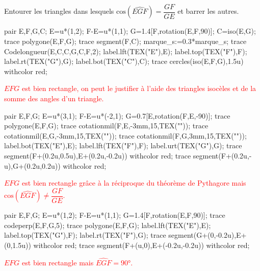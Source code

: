 \begin{corrige}
    Entourer les triangles dans lesquels \mbox{$\text{cos}(\widehat{EGF})=\dfrac{GF}{GE}$} et barrer les autres.
    
    \begin{minipage}{0.45\linewidth}
        \begin{Geometrie}
            pair E,F,G,C;
            E=u*(1,2);
            F-E=u*(1,1);            
            G=1.4[F,rotation(E,F,90)];
            C=iso(E,G);            
            trace polygone(E,F,G);
            trace segment(F,C);
            marque_s:=0.3*marque_s;
            trace Codelongueur(E,C,C,G,C,F,2);
            label.lft(TEX("E"),E);
            label.top(TEX("F"),F);
            label.rt(TEX("G"),G);
            label.bot(TEX("C"),C);
            trace cercles(iso(E,F,G),1.5u) withcolor red;
        \end{Geometrie}
        \textcolor{red}{$EFG$ est bien rectangle, on peut le justifier à l'aide des triangles isocèles et de la somme des angles d'un triangle.}

        \bigskip
        \begin{Geometrie}
            pair E,F,G;
            E=u*(3,1);
            F-E=u*(-2,1);            
            G=0.7[E,rotation(F,E,-90)];            
            trace polygone(E,F,G);            
            trace cotationmil(F,E,-3mm,15,TEX(""));
            trace cotationmil(E,G,-3mm,15,TEX(""));
            trace cotationmil(F,G,3mm,15,TEX(""));
            label.bot(TEX("E"),E);
            label.lft(TEX("F"),F);
            label.urt(TEX("G"),G);
            trace segment(F+(0.2u,0.5u),E+(0.2u,-0.2u)) withcolor red;
            trace segment(F+(0.2u,-u),G+(0.2u,0.2u)) withcolor red;
        \end{Geometrie}
        \textcolor{red}{$EFG$ est bien rectangle grâce à la réciproque du théorème de Pythagore mais $\text{cos}(\widehat{EGF})\neq\dfrac{GF}{GE}$.}
    \end{minipage}
    \hfill
    \begin{minipage}{0.45\linewidth}
        \begin{Geometrie}
            pair E,F,G;
            E=u*(1,2);
            F-E=u*(1,1);            
            G=1.4[F,rotation(E,F,90)];
            trace codeperp(E,F,G,5);
            trace polygone(E,F,G);
            label.lft(TEX("E"),E);
            label.top(TEX("G"),F);
            label.rt(TEX("F"),G);
            trace segment(G+(0,-0.2u),E+(0,1.5u)) withcolor red;
            trace segment(F+(u,0),E+(-0.2u,-0.2u)) withcolor red;
        \end{Geometrie}
        \textcolor{red}{$EFG$ est bien rectangle mais $\widehat{EGF}=\ang{90}$.}


\end{minipage}
\end{corrige}

